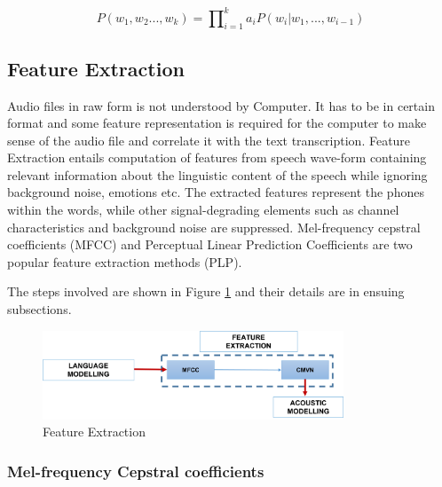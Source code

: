 \documentclass[3p,times]{elsarticle}
\begin{document}

\begin{equation}
P(w_{1},w_{2}...,w_{k}) = \prod\nolimits_{i = 1}^{k} a_{i} P(w_{i} | w_{1},...,w_{i-1})
\end{equation}


\subsection{Feature Extraction}
\label{sec:feature-extraction}
Audio files in raw form is not understood by Computer. It has to be in certain format and some feature representation is required for the computer to make sense of the audio file and correlate it with the text transcription. Feature Extraction entails computation of features from speech wave-form containing relevant information about the linguistic content of the speech while ignoring background noise, emotions etc. The extracted features represent the phones within the words, while other signal-degrading elements such as channel characteristics and background noise are suppressed. Mel-frequency cepstral coefficients (MFCC) and Perceptual Linear Prediction Coefficients are two popular feature extraction methods (PLP). %

The steps involved are shown in Figure \ref{fig:working_pipeline-3} and their details are in ensuing subsections.

\begin{figure}[h]
    \centering
    \includegraphics[width=0.8\textwidth]{img/workflow-3.png}
    \caption{Feature Extraction}
    \label{fig:working_pipeline-3}
\end{figure}


\subsubsection{Mel-frequency Cepstral coefficients}
\label{sub:MFCC-trg}
\end{document}
